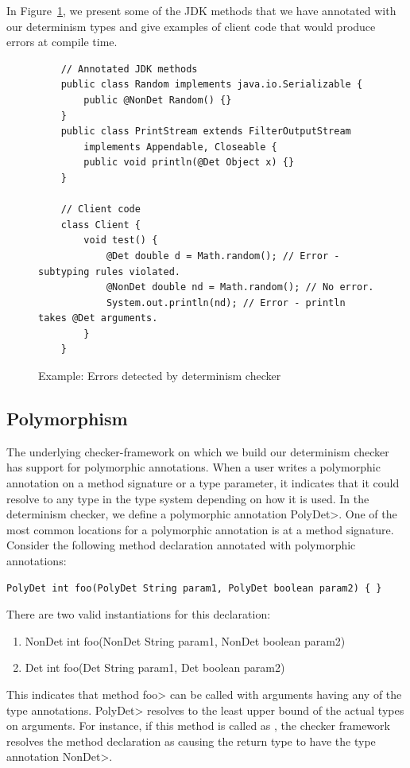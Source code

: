In Figure~\ref{code-determinism}, we present some of the JDK methods that we have annotated with our determinism types and give examples of
client code that would produce errors at compile time.
\begin{figure}
    \begin{verbatim}
    // Annotated JDK methods
    public class Random implements java.io.Serializable {
        public @NonDet Random() {}
    }
    public class PrintStream extends FilterOutputStream 
        implements Appendable, Closeable {
        public void println(@Det Object x) {}
    }
    
    // Client code
    class Client {
        void test() {
            @Det double d = Math.random(); // Error - subtyping rules violated.
            @NonDet double nd = Math.random(); // No error.
            System.out.println(nd); // Error - println takes @Det arguments.
        }
    }
    \end{verbatim}
    \caption{Example: Errors detected by determinism checker}
    \label{code-determinism}
\end{figure}

\subsection{Polymorphism}\label{polymorphism}

The underlying checker-framework on which we build our determinism checker has support for
polymorphic annotations. When a user writes a polymorphic annotation on a method signature or a type parameter,
it indicates that it could resolve to any type in the type system depending on how it is used.
In the determinism checker, we define a polymorphic annotation \<PolyDet>.
One of the most common locations for a polymorphic annotation is at a method signature.
Consider the following method declaration annotated with polymorphic annotations:
\begin{verbatim}
PolyDet int foo(PolyDet String param1, PolyDet boolean param2) { }
\end{verbatim}
There are two valid instantiations for this declaration:
\begin{enumerate}
    \item NonDet int foo(NonDet String param1, NonDet boolean param2) { }
    \item Det int foo(Det String param1, Det boolean param2) { }
\end{enumerate}
This indicates that method \<foo> can be called with arguments having any of the  type annotations.
 \<PolyDet> resolves to the least upper bound of
the actual types on arguments. For instance, if this method is called as , the 
checker framework resolves the method declaration as 
causing the return type to have the type annotation \<NonDet>.


